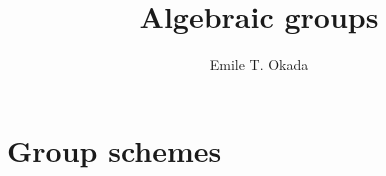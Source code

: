 \documentclass{memoir}
\title{Algebraic groups}
\author{Emile T. Okada}
\begin{document}
\maketitle
\tableofcontents
\chapter{Group schemes}
\end{document}
